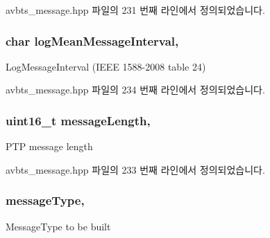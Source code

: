 avbts\+\_\+message.\+hpp 파일의 231 번째 라인에서 정의되었습니다.

\subsubsection[{\texorpdfstring{log\+Mean\+Message\+Interval}{logMeanMessageInterval}}]{\setlength{\rightskip}{0pt plus 5cm}char log\+Mean\+Message\+Interval\hspace{0.3cm}{\ttfamily [protected]}, {\ttfamily [inherited]}}\hypertarget{class_p_t_p_message_common_a2f897c329a52f79528d1b1248254dd1b}{}\label{class_p_t_p_message_common_a2f897c329a52f79528d1b1248254dd1b}
Log\+Message\+Interval (I\+E\+EE 1588-\/2008 table 24) 

avbts\+\_\+message.\+hpp 파일의 234 번째 라인에서 정의되었습니다.

\subsubsection[{\texorpdfstring{message\+Length}{messageLength}}]{\setlength{\rightskip}{0pt plus 5cm}uint16\+\_\+t message\+Length\hspace{0.3cm}{\ttfamily [protected]}, {\ttfamily [inherited]}}\hypertarget{class_p_t_p_message_common_a6c490faee54bca860c4d897aae50990f}{}\label{class_p_t_p_message_common_a6c490faee54bca860c4d897aae50990f}
P\+TP message length 

avbts\+\_\+message.\+hpp 파일의 233 번째 라인에서 정의되었습니다.

\subsubsection[{\texorpdfstring{message\+Type}{messageType}}]{ message\+Type\hspace{0.3cm}{\ttfamily [protected]}, {\ttfamily [inherited]}}\hypertarget{class_p_t_p_message_common_adb32627aa5b0e2dbad3ccd88aab07c05}{}\label{class_p_t_p_message_common_adb32627aa5b0e2dbad3ccd88aab07c05}
Message\+Type to be built 

